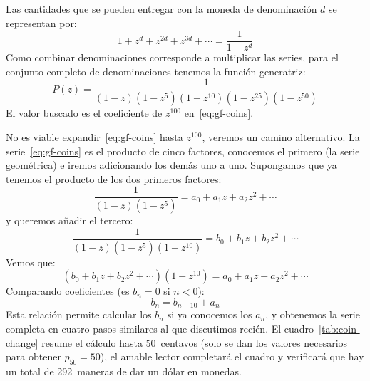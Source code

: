   Las cantidades que se pueden entregar
  con la moneda de denominación \(d\)
  se representan por:
  \begin{equation*}
    1 + z^d + z^{2 d} + z^{3 d} + \dotsb
      = \frac{1}{1 - z^d}
  \end{equation*}
  Como combinar denominaciones corresponde a multiplicar las series,
  para el conjunto completo de denominaciones
  tenemos la función generatriz:
  \begin{equation}
    \label{eq:gf-coins}
    P(z)
      = \frac{1}
	 {(1 - z) (1 - z^5) (1 - z^{10}) (1 - z^{25}) (1 - z^{50})}
  \end{equation}
  El valor buscado es el coeficiente de \(z^{100}\)
  en~\eqref{eq:gf-coins}.

  No es viable expandir~\eqref{eq:gf-coins} hasta \(z^{100}\),
  veremos un camino alternativo.
  La serie~\eqref{eq:gf-coins} es el producto de cinco factores,
  conocemos el primero
  (la serie geométrica)
  e iremos adicionando los demás uno a uno.
  Supongamos que ya tenemos el producto
  de los dos primeros factores:
  \begin{equation*}
    \frac{1}{(1 - z) (1 - z^5)}
      = a_0 + a_1 z + a_2 z^2 + \dotsb
  \end{equation*}
  y queremos añadir el tercero:
  \begin{equation*}
    \frac{1}{(1 - z) (1 - z^5) (1 - z^{10})}
      = b_0 + b_1 z + b_2 z^2 + \dotsb
  \end{equation*}
  Vemos que:
  \begin{equation*}
    (b_0 + b_1 z + b_2 z^2 + \dotsb) (1 - z^{10})
      = a_0 + a_1 z + a_2 z^2 + \dotsb
  \end{equation*}
  Comparando coeficientes
  (es \(b_n = 0\) si \(n < 0\)):
  \begin{equation*}
    b_n
      = b_{n - 10} + a_n
  \end{equation*}
  Esta relación
  permite calcular los \(b_n\) si ya conocemos los \(a_n\),
  y obtenemos la serie completa en cuatro pasos similares
  al que discutimos recién.
  El cuadro~\ref{tab:coin-change}
  resume el cálculo hasta \(50\)~centavos
  (solo se dan los valores necesarios para obtener \(p_{50} = 50\)),
  el amable lector completará el cuadro
  y verificará que hay un total
  de 292~maneras de dar un dólar en monedas.
